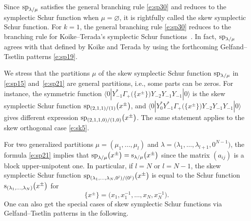 \documentclass[pdftex]{sigma}
\numberwithin{equation}{section}
\begin{document}
\begin{Remark} Since ${\rm sp}_{\lambda/\mu}$ satisfies the general branching rule \eqref{e:sp30} and reduces to the symplectic Schur function when $\mu=\varnothing$, it
is rightfully called
the skew symplectic Schur function. For $k=1$, the general branching rule \eqref{e:sp30} reduces to the branching rule for Koike--Terada's symplectic Schur functions~\cite[Theorem~3.1]{KT1990}. In fact, ${\rm sp}_{\lambda/\mu}$ agrees with that defined by Koike and Terada by using the forthcoming Gelfand--Tsetlin patterns \eqref{e:sp19}.
\end{Remark}
\begin{Remark}
We stress that the partitions $\mu$ of the skew symplectic Schur function ${\rm sp}_{\lambda/\mu}$
in \eqref{e:sp15} and~\eqref{e:sp21} are general partitions, i.e., some parts can be zeros. For instance, the symmetric function $\langle0|Y^*_{-1}\Gamma_+\big(\big\{x^{\pm}\big\}\big)Y_{-2}Y_{-1}Y_{-1}|0\rangle$ is the skew symplectic Schur function ${\rm sp}_{(2,1,1)/(1)}\big(x^{\pm}\big)$, and $\langle0|Y^*_{0}Y^*_{-1}\Gamma_+\big(\big\{x^{\pm}\big\}\big)Y_{-2}Y_{-1}Y_{-1}|0\rangle$ gives different expression ${\rm sp}_{(2,1,1,0)/(1,0)}\big(x^{\pm}\big)$.
The same statement applies to the skew orthogonal case \eqref{e:sk5}.
\end{Remark}
\begin{Remark}\label{e:remark1}
For two generalized partitions $\mu=(\mu_1,\dots,\mu_l)$ and $\lambda=\big(\lambda_1,\dots,\lambda_{l+1},0^{N-1}\big)$, the
formula \eqref{e:sp21} implies that
${\rm sp}_{\lambda/\mu}\big(x^{\pm}\big)={\rm s}_{\lambda/\mu}\big(x^{\pm}\big)$ since the matrix $(a_{ij})$ is a block upper-unipotent one.
In particular, if $l=N$ or $l=N-1$, the skew symplectic Schur function ${\rm sp}_{(\lambda_1,\dots,\lambda_N,0^l)/(0^l)}\big(x^{\pm}\big)$ is equal to the Schur function ${\rm s}_{(\lambda_1,\dots,\lambda_N)}\big(x^{\pm}\big)$ for
\[
\big\{x^{\pm}\big\}=\big(x_1,x^{-1}_1,\dots,x_N,x^{-1}_N\big).
\]
One can also get the special cases of skew symplectic Schur functions via Gelfand--Tsetlin patterns in the following.
\end{Remark}
\end{document}
